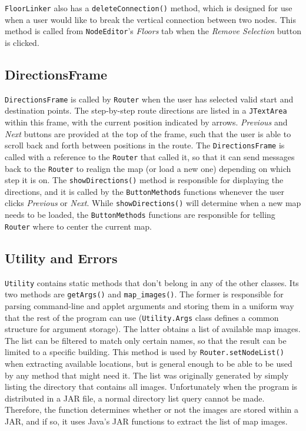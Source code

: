 \documentclass[12pt,letterpaper,titlepage]{article}   %
\begin{document}
\texttt{FloorLinker} also has a \texttt{deleteConnection()} method,
which is designed for
use when a user would like to break the vertical connection between two
nodes. This method is called from \texttt{NodeEditor}'s \emph{Floors} tab
when the \emph{Remove Selection} button is clicked.
 
\subsection{DirectionsFrame}

\texttt{DirectionsFrame} is called by \texttt{Router} when the user has
selected valid
start and destination points. The step-by-step route directions are
listed in a \texttt{JTextArea} within this frame, with the current position
indicated by arrows. \emph{Previous} and \emph{Next} buttons are provided
at the top
of the frame, such that the user is able to scroll back and forth
between positions in the route. The \texttt{DirectionsFrame} is called with a
reference to the \texttt{Router} that called it, so that it can send messages
back to the \texttt{Router} to realign the map (or load a new one) depending on
which step it is on. The \texttt{showDirections()} method is responsible for
displaying the directions, and it is called by the \texttt{ButtonMethods}
functions whenever the user clicks \emph{Previous} or \emph{Next}. While
\texttt{showDirections()} will determine when a new map needs to be loaded, the
\texttt{ButtonMethods} functions are responsible for telling \texttt{Router}
where to center the current map.

\subsection{Utility and Errors}

\texttt{Utility} contains static methods that don't belong in any of the other
classes. Its two methods are \texttt{getArgs()} and \texttt{map\_images()}.
The former is
responsible for parsing command-line and applet arguments and storing
them in a uniform way that the rest of the program can use
(\texttt{Utility.Args} class defines a common structure for argument storage).
The latter
obtains a list of available map images. The list can be filtered to
match only certain names, so that the result can be limited to a
specific building. This method is used by \texttt{Router.setNodeList()} when
extracting available locations, but is general enough to be able to be
used by any method that might need it. The list was originally generated
by simply listing the directory that contains all images. Unfortunately
when the program is distributed in a JAR file, a normal directory list
query cannot be made. Therefore, the function determines whether or not
the images are stored within a JAR, and if so, it uses Java's JAR
functions to extract the list of map images.
\end{document}
